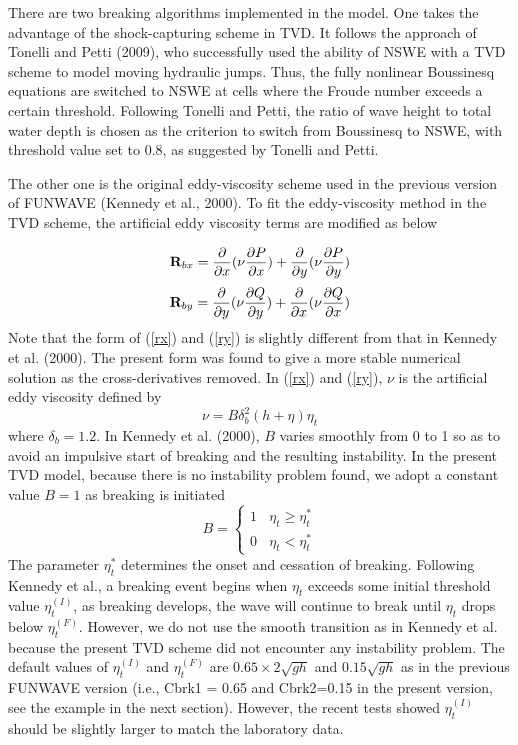 \documentclass[11pt]{article}
\newcommand{\be}{\begin{equation}}
\newcommand{\ee}{\end{equation}}
\begin{document}
There are two breaking algorithms implemented in the model. One takes the advantage of the shock-capturing scheme in TVD. 
It  follows the approach of Tonelli and Petti (2009),  who successfully used the ability of  NSWE  with a TVD scheme to model moving hydraulic jumps. Thus, the fully nonlinear Boussinesq equations are switched  to NSWE at cells where the Froude number exceeds  a certain threshold. Following Tonelli and Petti, the ratio of wave height to total water depth is chosen as  the criterion to switch from Boussinesq to NSWE, with  threshold value  set to 0.8,  as suggested by Tonelli and Petti. 

The other one is the original eddy-viscosity scheme used in the previous version of FUNWAVE (Kennedy et al., 2000). To fit the eddy-viscosity method in the TVD scheme, the artificial eddy viscosity terms are modified as below

\be
{\bf R}_{bx} = \frac{\partial }{\partial x} (\nu \frac{\partial P}{\partial x}) + \frac{\partial }{\partial y} (\nu \frac{\partial P}{\partial y} )
\label{rx}
\ee
\be
{\bf R}_{by} = \frac{\partial }{\partial y} (\nu \frac{\partial Q}{\partial y}) + \frac{\partial }{\partial x} (\nu \frac{\partial Q}{\partial x}) 
\label{ry}
\ee
Note that the form of (\ref{rx}) and (\ref{ry}) is slightly different from that in Kennedy et al. (2000). The present form was found to give a more stable numerical solution as the cross-derivatives removed. In (\ref{rx}) and (\ref{ry}), $\nu$ is the artificial eddy viscosity defined by
\be
\nu = B \delta_b^2 (h+\eta) \eta_t
\label{nu}
\ee
where $\delta_b = 1.2$. In Kennedy et al. (2000), $B$ varies smoothly from 0 to 1 so as to avoid an impulsive start of breaking and the resulting instability. In the present TVD model, because there is no instability problem found, we adopt a constant value $B=1$ as breaking is initiated
\be
B =  \left \{  \begin{array}{l} 1 \ \ \ \  \eta_t \ge  \eta_t^*  \\
0 \ \ \ \ \eta_t <  \eta_t^*
\end{array}
\right .
\ee
The parameter $\eta_t^*$ determines the onset and cessation of breaking. Following Kennedy et al., a breaking event begins when $\eta_t$ exceeds some initial threshold value $\eta_t^{(I)}$, as breaking develops, the wave will continue to break until $\eta_t$ drops below $\eta_t^{(F)}$. However, we do not use the smooth transition as in Kennedy et al. because the present TVD scheme did not encounter any instability problem.  The default values of $\eta_t^{(I)}$ and $\eta_t^{(F)}$ are $0.65\times 2  \sqrt{gh}$ and  $0.15 \sqrt{gh}$ as in the previous FUNWAVE version (i.e., Cbrk1 = 0.65 and Cbrk2=0.15 in the present version, see the example in the next section). However, the recent tests showed $\eta_t^{(I)}$ should be slightly larger to match the laboratory data. 
\end{document}
